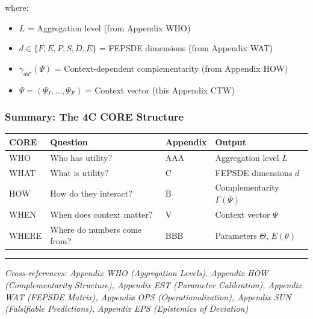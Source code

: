 where:
\begin{itemize}
    \item $L$ = Aggregation level (from Appendix WHO)
    \item $d \in \{F, E, P, S, D, E\}$ = FEPSDE dimensions (from Appendix WAT)
    \item $\gamma_{dd'}(\Psi)$ = Context-dependent complementarity (from Appendix HOW)
    \item $\Psi = (\Psi_I, \ldots, \Psi_F)$ = Context vector (this Appendix CTW)
\end{itemize}

\subsubsection{Summary: The 4C CORE Structure}

\begin{center}
\begin{tabular}{llll}
\toprule
\textbf{CORE} & \textbf{Question} & \textbf{Appendix} & \textbf{Output} \\
\midrule
WHO & Who has utility? & AAA & Aggregation level $L$ \\
WHAT & What is utility? & C & FEPSDE dimensions $d$ \\
HOW & How do they interact? & B & Complementarity $\Gamma(\Psi)$ \\
WHEN & When does context matter? & V & Context vector $\Psi$ \\
WHERE & Where do numbers come from? & BBB & Parameters $\Theta$, $E(\theta)$ \\
\bottomrule
\end{tabular}
\end{center}

\vspace{0.5em}
\hrule
\vspace{0.5em}
\noindent\textit{Cross-references: Appendix WHO (Aggregation Levels), 
Appendix HOW (Complementarity Structure), Appendix EST (Parameter Calibration),
Appendix WAT (FEPSDE Matrix), Appendix OPS (Operationalization), 
Appendix SUN (Falsifiable Predictions), Appendix EPS (Epistemics of Deviation)}




